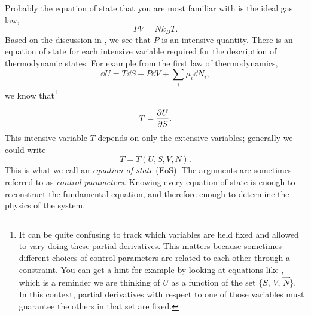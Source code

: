 Probably the equation of state that you are most familiar with is the 
ideal gas law,
\begin{equation}
  PV=Nk_BT.
\end{equation}
Based on the discussion in , we see that $P$ is
an intensive quantity.
There is an equation of state for each intensive variable required for the
description of thermodynamic states. For example from the
first law of thermodynamics,
\begin{equation}\label{eq:fslaw}
  \dd{U}=T\dd{S}-P\dd{V}+\sum_i\mu_i\dd{N}_i,
\end{equation}
we know that\footnote{It can be quite confusing to track which variables
are held fixed and allowed to vary doing these partial derivatives.
This matters because sometimes different choices of control parameters
are related to each other through a constraint.
You can get a hint for example by looking at equations like
, which is a reminder we are thinking of
$U$ as a function of the set \{$S$, $V$, $\vec{N}$\}. In this context,
partial derivatives with respect to one of those variables must
guarantee the others in that set are fixed.}

\begin{equation}
  T=\pdv{U}{S}.
\end{equation}
This intensive variable $T$ depends on only the extensive variables; 
generally we could write
\begin{equation}
  T=T(U,S,V,N).
\end{equation}
This is what we call an {\it equation of state}
(EoS). The arguments are sometimes referred to as 
{\it control parameters}. Knowing every equation 
of state is enough to reconstruct the fundamental equation, and therefore 
enough to determine the physics of the system.

